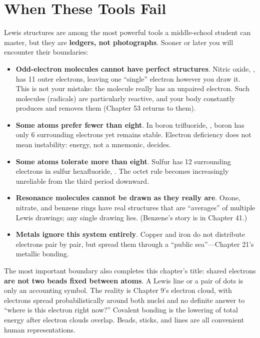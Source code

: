 \section{When These Tools Fail}

Lewis structures are among the most powerful tools a middle-school student can master, but they are \textbf{ledgers, not photographs}. Sooner or later you will encounter their boundaries:

\begin{itemize}[itemsep=2pt]
\item \textbf{Odd-electron molecules cannot have perfect structures}. Nitric oxide, , has 11 outer electrons, leaving one ``single'' electron however you draw it. This is not your mistake: the molecule really has an unpaired electron. Such molecules (radicals) are particularly reactive, and your body constantly produces and removes them (Chapter 53 returns to them).
\item \textbf{Some atoms prefer fewer than eight}. In boron trifluoride, , boron has only 6 surrounding electrons yet remains stable. Electron deficiency does not mean instability: energy, not a mnemonic, decides.
\item \textbf{Some atoms tolerate more than eight}. Sulfur has 12 surrounding electrons in sulfur hexafluoride, . The octet rule becomes increasingly unreliable from the third period downward.
\item \textbf{Resonance molecules cannot be drawn as they really are}. Ozone, nitrate, and benzene rings have real structures that are ``averages'' of multiple Lewis drawings; any single drawing lies. (Benzene's story is in Chapter 41.)
\item \textbf{Metals ignore this system entirely}. Copper and iron do not distribute electrons pair by pair, but spread them through a ``public sea''---Chapter 21's metallic bonding.
\end{itemize}

The most important boundary also completes this chapter's title: shared electrons \textbf{are not two beads fixed between atoms}. A Lewis line or a pair of dots is only an accounting symbol. The reality is Chapter 9's electron cloud, with electrons spread probabilistically around both nuclei and no definite answer to ``where is this electron right now?'' Covalent bonding is the lowering of total energy after electron clouds overlap. Beads, sticks, and lines are all convenient human representations.

